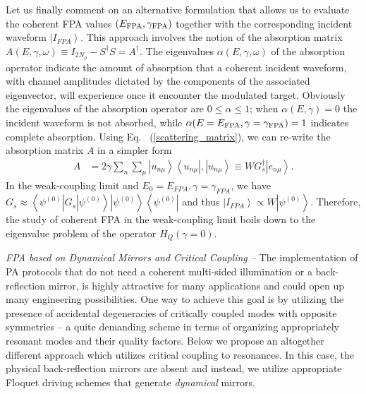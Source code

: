 \documentclass[aps,prl,twocolumn,showpacs,groupedaddress,amsmath,amssymb]{revtex4}
\begin{document}
Let us finally comment on an alternative formulation that allows us to evaluate the coherent FPA values $(E_{\rm FPA},\gamma_{\rm FPA})$ 
together with the corresponding incident waveform $\left|I_{FPA}\right\rangle$. This approach involves the notion of the absorption 
matrix $A(E,\gamma,\omega)\equiv I_{2N_{p}}-S^{\dagger}S=A^{\dagger}$. The eigenvalues $\alpha(E,\gamma,\omega)$ of the 
absorption operator indicate the amount of absorption that a coherent 
incident waveform, with channel amplitudes dictated by the components of the associated eigenvector, will experience once it encounter the 
modulated target. Obviously the eigenvalues of the absorption operator are $0 \leq \alpha\leq 1$; when $\alpha(E,\gamma)=0$ the incident 
waveform is not absorbed, while $\alpha(E=E_{\rm FPA},\gamma=\gamma_{\rm FPA})=1$ indicates complete absorption. Using Eq.~
(\ref{scattering_matrix}), we can re-write the absorption matrix $A$ in a simpler form
\begin{align}
A & =2\gamma\sum_{n}\sum_{\mu}\left|u_{n\mu}\right\rangle \left\langle u_{n\mu}\right|,\left|u_{n\mu}\right\rangle \equiv WG_{s}^{\dagger}
\left|e_{n\mu}\right\rangle .
\label{absoption}
\end{align}
In the weak-coupling limit and $E_0=E_{FPA}, \gamma=\gamma_{FPA}$, we have $G_{s}\approx\left\langle \psi^{\left(0\right)}\right|G_{s}
\left|\psi^{\left(0\right)}\right\rangle \left|\psi^{\left(0\right)}\right\rangle \left\langle \psi^{\left(0\right)}\right|$ and thus $\left|I_{FPA}\right
\rangle \propto$$W\left|\psi^{\left(0\right)}\right\rangle$. Therefore, the study of coherent FPA in the weak-coupling limit boils down to the 
eigenvalue problem of the operator $H_{Q}\left(\gamma=0\right)$. 


{\it FPA based on Dynamical Mirrors and Critical Coupling  --} The implementation of PA protocols that do not need a coherent multi-sided 
illumination or a back-reflection mirror, is highly attractive for many applications and could open up many engineering possibilities. One way 
to achieve this goal is by utilizing the presence of accidental degeneracies of critically coupled modes with opposite symmetries \cite{PLF14}
 -- a quite demanding scheme in terms of organizing appropriately resonant modes and their quality factors. Below we propose an altogether 
different approach which utilizes critical coupling to resonances. In this case, the physical back-reflection mirrors are absent and instead, we 
utilize appropriate Floquet driving schemes that generate {\it dynamical} mirrors. 
\end{document}
